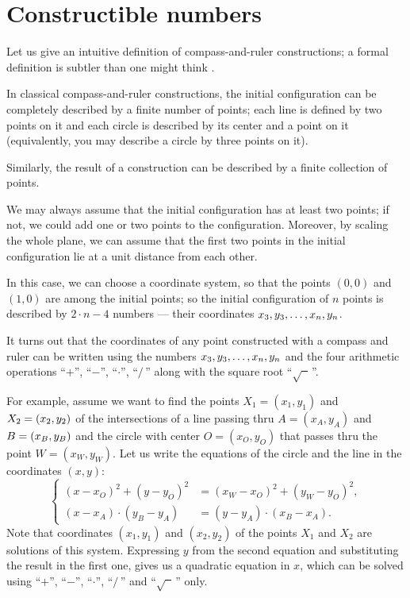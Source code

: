 %

\section{Constructible numbers}

Let us give an intuitive definition of compass-and-ruler constructions; a formal definition is subtler than one might think \cite{engeler}.

In classical compass-and-ruler constructions, the initial configuration can be completely described by a finite number of points;
each line is defined by two points on it and each circle is described by its center and a point on it (equivalently, you may describe a circle by three points on it).

Similarly, the result of a construction can be described by a finite collection of points.

We may always assume that the initial configuration has at least two points;
if not, we could add one or two points to the configuration.
Moreover, by scaling the whole plane, we can assume that the first two points in the initial configuration lie at a unit distance from each other.

In this case, we can choose a  coordinate system, 
so that the points $(0,0)$ and $(1,0)$ are among the initial points;
so the initial configuration of $n$ points is described by 
$2\cdot n-4$ numbers --- their coordinates $x_3,y_3,\dots,x_n,y_n$. 

\medskip

It turns out that the coordinates of any point constructed with a compass and ruler
can be written using the numbers $x_3,y_3,\dots,x_n,y_n$ and the four arithmetic operations ``$+$'', ``$-$'', ``$\cdot$'', ``$/\,$''
along with the square root ``$\sqrt{\phantom{a}}\,$''.

For example, assume we want to find the points $X_1=(x_1,y_1)$ and $X_2=(x_2,y_2)$ of the intersections of 
a line passing thru $A=(x_A,y_A)$ and $B=(x_B,y_B)$ and
the circle with center $O=(x_O,y_O)$ that passes thru the point $W=(x_W,y_W)$.
Let us write the equations of the circle and the line in the coordinates $(x,y)$:
$$
\left\{
\begin{aligned}
(x-x_O)^2+(y-y_O)^2&=(x_W-x_O)^2+(y_W-y_O)^2,
\\
(x-x_A)\cdot(y_B-y_A)&=(y-y_A)\cdot(x_B-x_A).
\end{aligned}
\right.
$$
Note that coordinates $(x_1,y_1)$ and $(x_2,y_2)$ of the points $X_1$ and $X_2$ are solutions of this system.
Expressing $y$ from the second equation and substituting the result in the first one, gives us a quadratic equation in $x$, 
which can be solved using ``$+$'', ``$-$'', ``$\cdot$'', ``$/\,$''
and  ``$\sqrt{\phantom{a}}\,$'' only.


